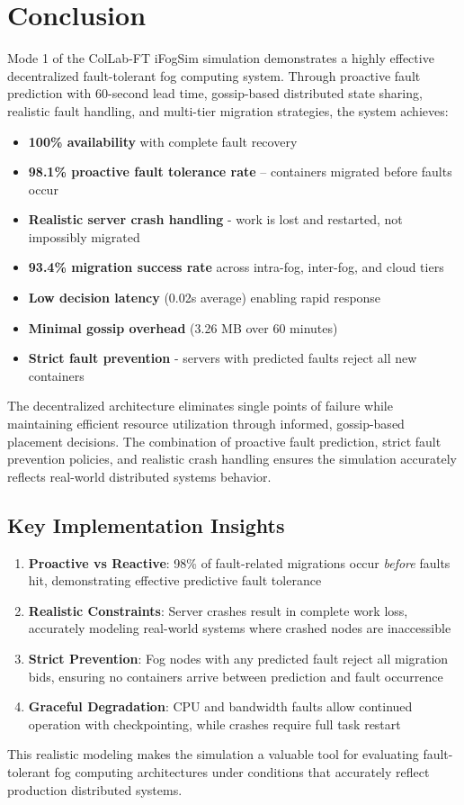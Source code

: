 \documentclass[12pt,a4paper]{article}
\begin{document}
\section{Conclusion}

Mode 1 of the ColLab-FT iFogSim simulation demonstrates a highly effective decentralized fault-tolerant fog computing system. Through proactive fault prediction with 60-second lead time, gossip-based distributed state sharing, realistic fault handling, and multi-tier migration strategies, the system achieves:

\begin{itemize}
    \item \textbf{100\% availability} with complete fault recovery
    \item \textbf{98.1\% proactive fault tolerance rate} -- containers migrated before faults occur
    \item \textbf{Realistic server crash handling} - work is lost and restarted, not impossibly migrated
    \item \textbf{93.4\% migration success rate} across intra-fog, inter-fog, and cloud tiers
    \item \textbf{Low decision latency} (0.02s average) enabling rapid response
    \item \textbf{Minimal gossip overhead} (3.26 MB over 60 minutes)
    \item \textbf{Strict fault prevention} - servers with predicted faults reject all new containers
\end{itemize}

The decentralized architecture eliminates single points of failure while maintaining efficient resource utilization through informed, gossip-based placement decisions. The combination of proactive fault prediction, strict fault prevention policies, and realistic crash handling ensures the simulation accurately reflects real-world distributed systems behavior.

\subsection{Key Implementation Insights}

\begin{enumerate}
    \item \textbf{Proactive vs Reactive}: 98\% of fault-related migrations occur \textit{before} faults hit, demonstrating effective predictive fault tolerance
    \item \textbf{Realistic Constraints}: Server crashes result in complete work loss, accurately modeling real-world systems where crashed nodes are inaccessible
    \item \textbf{Strict Prevention}: Fog nodes with any predicted fault reject all migration bids, ensuring no containers arrive between prediction and fault occurrence
    \item \textbf{Graceful Degradation}: CPU and bandwidth faults allow continued operation with checkpointing, while crashes require full task restart
\end{enumerate}

This realistic modeling makes the simulation a valuable tool for evaluating fault-tolerant fog computing architectures under conditions that accurately reflect production distributed systems.
\end{document}
